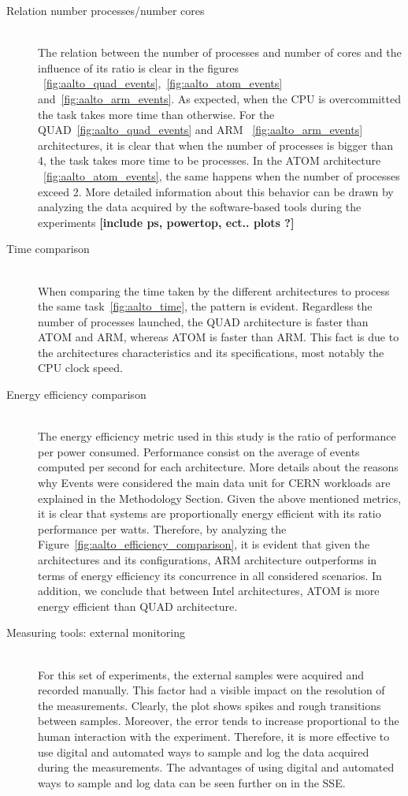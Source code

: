 \begin{description}
\item[Relation number processes/number cores] \hfill \\
The relation between the number of processes and number of cores and the
influence of its ratio is clear in the figures 
~\ref{fig:aalto_quad_events},~\ref{fig:aalto_atom_events} and~\ref{fig:aalto_arm_events}. 
As expected, when the CPU is overcommitted the task takes more time than
otherwise. For the QUAD~\ref{fig:aalto_quad_events} and ARM
~\ref{fig:aalto_arm_events} architectures, it is clear that when the number of
processes is bigger than 4, the task takes more time to be processes. In the
ATOM architecture ~\ref{fig:aalto_atom_events}, the same happens when the number
of processes exceed 2. More detailed information about this behavior can be
drawn by analyzing the data acquired by the software-based tools during the
experiments \textbf{[include ps, powertop, ect.. plots ?]} 


\item[Time comparison] \hfill \\
When comparing the time taken by the different architectures to process the same
task~\ref{fig:aalto_time}, the pattern is evident. 
Regardless the number of processes launched, the 
QUAD architecture is faster than ATOM and ARM, whereas ATOM is faster than ARM.
This fact is due to the architectures characteristics and its specifications, 
most notably the CPU clock speed.\\

\item[Energy efficiency comparison] \hfill \\
The energy efficiency metric used in this study 
is the ratio of performance per power consumed. Performance consist on the 
average of events computed per second for each architecture. More details about 
the reasons why 
Events were considered the main data unit for CERN workloads are explained in the
 Methodology Section. Given the above mentioned metrics, it is clear that  
systems are  proportionally energy efficient with its ratio performance per 
watts. Therefore, by analyzing the Figure~\ref{fig:aalto_efficiency_comparison}, it is evident that given the architectures and its configurations, ARM 
architecture 
outperforms in terms of energy efficiency its concurrence in all considered 
scenarios. In addition, we conclude that between Intel architectures, ATOM is
more energy efficient than QUAD architecture. 

\item[Measuring tools: external monitoring] \hfill \\
For this set of experiments, the external samples were acquired and recorded 
manually.
This factor had a visible impact on the resolution of the measurements. Clearly,
the plot shows  spikes and rough transitions between samples. Moreover, the error
tends to increase proportional to the human interaction with the experiment. 
Therefore, it is more effective to use digital and automated ways to sample and
log the data acquired during the measurements. The advantages of using digital
and automated ways to sample and log data can be seen further on in the SSE.


\end{description}
